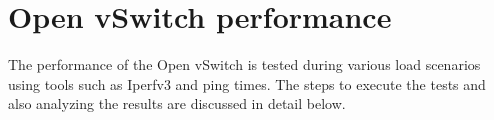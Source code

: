 %	
\section{Open vSwitch performance}
The performance of the Open vSwitch is tested during various load scenarios using tools such as Iperfv3 and ping times. The steps to execute the tests and also analyzing the results are discussed in detail below.

